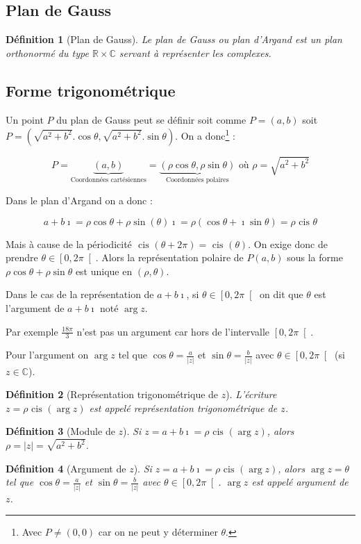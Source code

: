 \documentclass[a4paper,10pt]{report}
\newcommand{\cis}{\mbox{ cis }}
\newtheorem{de}{Définition}
\begin{document}
\subsection{Plan de Gauss}
\begin{de}[Plan de Gauss]
Le plan de Gauss ou plan d'Argand est un plan orthonormé du type $\mathbb{R}\times\mathbb{C}$ servant à représenter les complexes.
\end{de}

\subsection{Forme trigonométrique}
Un point $P$ du plan de Gauss peut se définir soit comme $P=(a,b)$ soit $P=(\sqrt{a^2+b^2}.\cos \theta,\sqrt{a^2+b^2}.\sin \theta)$. On a donc\footnote{Avec $P \neq (0,0)$ car on ne peut y déterminer $\theta$.} :

$$P=\underbrace{(a,b)}_{\mbox{Coordonnées cartésiennes}} = \underbrace{(\rho \cos \theta, \rho \sin \theta)}_{\mbox{Coordonnées polaires}} \mbox { où } \rho=\sqrt{a^2+b^2}$$

Dans le plan d'Argand on a donc :

$$a+b\imath = \rho \cos \theta + \rho \sin (\theta) \imath = \rho (\cos \theta + \imath \sin \theta) = \rho \cis \theta$$

Mais à cause de la périodicité $\cis (\theta + 2\pi) = \cis (\theta)$. On exige donc de prendre $\theta \in \left[ 0, 2\pi \right[$. Alors la représentation polaire de $P(a,b)$ sous la forme $\rho \cos \theta + \rho \sin \theta$ est unique en $(\rho,\theta)$.

Dans le cas de la représentation de $a+b\imath$, si $\theta \in \left[ 0, 2\pi \right[$ on dit que $\theta$ est l'argument de $a+b\imath$ noté $\arg z$.

Par exemple $\frac{18\pi}{3}$ n'est pas un argument car hors de l'intervalle $\left[ 0, 2\pi \right[$.

Pour l'argument on $\arg z$ tel que $\cos \theta=\frac{a}{\vert z \vert}$ et $\sin \theta=\frac{b}{\vert z \vert}$ avec $\theta \in \left[ 0, 2\pi \right[$ (si $z \in \mathbb{C}$).

\begin{de}[Représentation trigonométrique de $z$]
L'écriture \\ $z = \rho \cis (\arg z)$ est appelé représentation trigonométrique de $z$.
\end{de}
\begin{de}[Module de $z$]
Si $z=a+b\imath=\rho \cis(\arg z)$, alors $\rho = \vert z \vert = \sqrt {a^2+b^2}$.
\end{de}
\begin{de}[Argument de $z$]
Si $z=a+b\imath=\rho \cis(\arg z)$, alors $\arg z = \theta$ tel que $\cos \theta=\frac{a}{\vert z \vert}$ et $\sin \theta=\frac{b}{\vert z \vert}$ avec $\theta \in \left[ 0, 2\pi \right[$. $\arg z$ est appelé argument de $z$.
\end{de}
\end{document}
